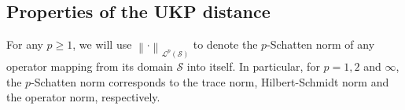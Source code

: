 \documentclass{article} %
\newcommand{\Lp}{\mathcal{L}^{p}}
\newcommand{\norm}[1]{\left\|#1\right\|}
\newcommand{\metricstname}{UKP }
\theoremstyle{plain}
\newcounter{remarkno}
\newtheorem{remark}[remarkno]{Remark}
\begin{document}

\subsection{Properties of the \metricstname distance}\label{Properties of the UKP distance}

For any $p \geq 1$, we will use $\norm{\cdot}_{\Lp(\mathcal{S})}$ to denote the $p$-Schatten norm of any operator mapping from its domain $\mathcal{S}$ into itself. In particular, for $p=1,2$ and $\infty$, the $p$-Schatten norm corresponds to the trace norm, Hilbert-Schmidt norm and the operator norm, respectively.
\end{document}
